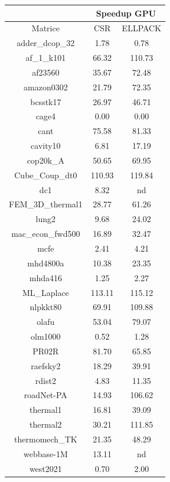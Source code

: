 \documentclass[12pt,halfline,a4paper]{ouparticle}
\begin{document}
\begin{center}
\begin{tabular}{|| c | c | c ||} 
\hline
 & \multicolumn{2}{c||}{Speedup GPU}\\
\hline
Matrice&CSR&ELLPACK\\
\hline
adder\_dcop\_32 & 1.78 & 0.78 \\
\hline
af\_1\_k101 & 66.32 & 110.73 \\
\hline
af23560 & 35.67 & 72.48 \\
\hline
amazon0302 & 21.79 & 72.35 \\
\hline
bcsstk17 & 26.97 & 46.71 \\
\hline
cage4 & 0.00 & 0.00 \\
\hline
cant & 75.58 & 81.33 \\
\hline
cavity10 & 6.81 & 17.19 \\
\hline
cop20k\_A & 50.65 & 69.95 \\
\hline
Cube\_Coup\_dt0 & 110.93 & 119.84 \\
\hline
dc1 & 8.32 & nd \\
\hline
FEM\_3D\_thermal1 & 28.77 & 61.26 \\
\hline
lung2 & 9.68 & 24.02 \\
\hline
mac\_econ\_fwd500 & 16.89 & 32.47 \\
\hline
mcfe & 2.41 & 4.21 \\
\hline
mhd4800a & 10.38 & 23.35 \\
\hline
mhda416 & 1.25 & 2.27 \\
\hline
ML\_Laplace & 113.11 & 115.12 \\
\hline
nlpkkt80 & 69.91 & 109.88 \\
\hline
olafu & 53.04 & 79.07 \\
\hline
olm1000 & 0.52 & 1.28 \\
\hline
PR02R & 81.70 & 65.85 \\
\hline
raefsky2 & 18.29 & 39.91 \\
\hline
rdist2 & 4.83 & 11.35 \\
\hline
roadNet-PA & 14.93 & 106.62 \\
\hline
thermal1 & 16.81 & 39.09 \\
\hline
thermal2 & 30.21 & 111.85 \\
\hline
thermomech\_TK & 21.35 & 48.29 \\
\hline
webbase-1M & 13.11 & nd \\
\hline
west2021 & 0.70 & 2.00 \\
\hline
\end{tabular}
\end{center}
\end{document}
